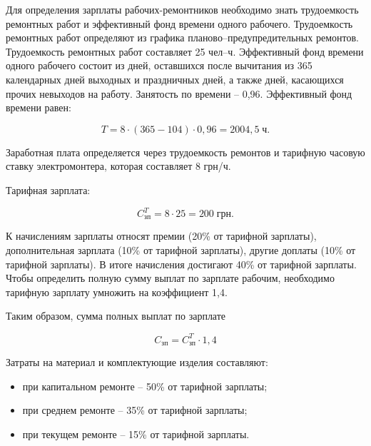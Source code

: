         Для определения зарплаты рабочих-ремонтников необходимо знать
        трудоемкость ремонтных работ и эффективный фонд времени одного
        рабочего.  Трудоемкость ремонтных работ определяют из графика
        планово–предупредительных ремонтов.  Трудоемкость ремонтных работ
        составляет 25 чел–ч.  Эффективный фонд времени одного рабочего состоит
        из дней, оставшихся после вычитания из 365 календарных дней выходных и
        праздничных дней, а также дней, касающихся прочих невыходов на работу.
        Занятость по времени – 0,96. Эффективный фонд времени равен:

        \begin{equation}
            T = 8 \cdot (365 - 104) \cdot 0,96 = 2004,5 \; \text{ч}. 
        \end{equation}

        Заработная плата определяется через трудоемкость ремонтов и тарифную
        часовую ставку электромонтера, которая составляет 8 грн/ч.

        Тарифная зарплата:

        \begin{equation}
            C_\text{зп}^T = 8 \cdot 25 = 200 \; \text{грн}. 
        \end{equation}

        К начислениям зарплаты относят премии (20\% от тарифной зарплаты),
        дополнительная зарплата (10\% от тарифной зарплаты), другие доплаты
        (10\% от тарифной зарплаты). В итоге начисления достигают 40\% от
        тарифной зарплаты.  Чтобы определить полную сумму выплат по зарплате
        рабочим, необходимо тарифную зарплату умножить на коэффициент 1,4.

        Таким образом, сумма полных выплат по зарплате

        \begin{equation}
            C_\text{зп} = C_\text{зп}^T \cdot 1,4
        \end{equation}

        Затраты на материал и комплектующие изделия составляют:
        \begin{itemize}
            \item при капитальном ремонте – 50\% от тарифной зарплаты;
            \item при среднем ремонте – 35\% от тарифной зарплаты;
            \item при текущем ремонте – 15\% от тарифной зарплаты.
        \end{itemize}

